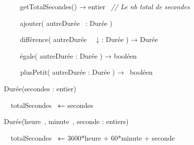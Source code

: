 {\sffamily
\ \ \ \  getTotalSecondes() → entier~\textit{ //
Le nb total de secondes}}


\bigskip

{\sffamily
\ \ \ \  ajouter( autreDurée~ : Durée ) }

{\sffamily
\ \ \ \  différence( autreDurée~~ ↓ : Durée ) →
Durée}

{\sffamily
\ \ \ \  égale( autreDurée : Durée ) → booléen }

{\sffamily
\textit{\ \ \ \ } plusPetit( autreDurée : Durée
) → \ booléen}

{\sffamily
{}}


\bigskip


\bigskip

{\sffamily
{} Durée(secondes : entier) }

{\sffamily
\textstyleMotCl{\textmd{\ \ }}\textstyleMotCl{\textmd{
}}}

{\sffamily
\textstyleMotCl{\textmd{\ \ \ \ }}}

{\sffamily
\textstyleMotCl{\textmd{\ \ }}}

{\sffamily
\ \ totalSecondes~ \textbf{←} secondes}

{\sffamily
{}}


\bigskip

{\sffamily
{} Durée(heure~, minute~, seconde : entiers)
}

{\sffamily
\textstyleMotCl{\textmd{\ \ }}\textstyleMotCl{\textmd{
}}}

{\sffamily
\textstyleMotCl{\textmd{\ \ \ \ }}}

{\sffamily
\textstyleMotCl{\textmd{\ \ }}}

{\sffamily
\ \ totalSecondes~ \textbf{←} 3600*heure + 60*minute + seconde}

